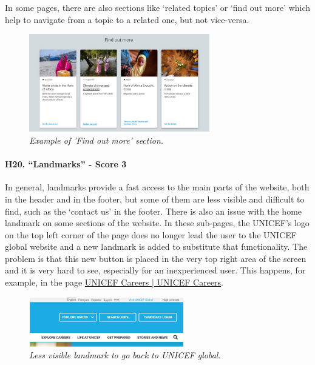 \newline In some pages, there are also sections like ‘related topics’ or ‘find out more’ which help to navigate from a topic to a related one, but not vice-versa.
\begin{figure}[!h]
	\begin{center}
		\includegraphics[width=0.7\textwidth]{FinalScores22.jpg}
		\captionsetup{font=small}
		\caption{\textit{Example of 'Find out more' section.}}
	\end{center}
\end{figure}
\newline
\newline \paragraph{H20. “Landmarks” - Score 3}	\label{subsec:H20}In general, landmarks provide a fast access to the main parts of the website, both in the header and in the footer, but some of them are less visible and difficult to find, such as the ‘contact us’ in the footer.
\newline There is also an issue with the home landmark on some sections of the website. In these sub-pages, the UNICEF's logo on the top left corner of the page does no longer lead the user to the UNICEF global website and a new landmark is added to substitute that functionality. The problem is that this new button is placed in the very top right area of the screen and it is very hard to see, especially for an inexperienced user. This happens, for example, in the page \href{https://www.unicef.org/careers/}{UNICEF Careers | UNICEF Careers}.
\begin{figure}[!h]
	\begin{center}
		\includegraphics[width=0.6\textwidth]{FinalScores23.jpg}
		\captionsetup{font=small}
		\caption{\textit{Less visible landmark to go back to UNICEF global.}}
	\end{center}
\end{figure}
